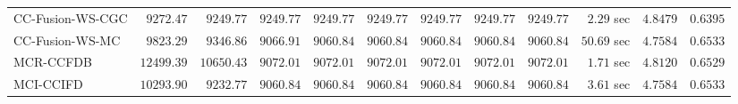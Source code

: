 \begin{table}[H]
\begin{tabular}{lrrrrrrrrrrr}
    CC-Fusion-WS-CGC & $      9272.47$ & $      9249.77$ & $      9249.77$ & $      9249.77$ & $      9249.77$ & $      9249.77$ & $      9249.77$ & $      9249.77$ & $         2.29$ sec    & $       4.8479$  & $       0.6395$ \\ 
     CC-Fusion-WS-MC & $      9823.29$ & $      9346.86$ & $      9066.91$ & $      9060.84$ & $      9060.84$ & $      9060.84$ & $      9060.84$ & $      9060.84$ & $        50.69$ sec    & $       4.7584$  & $       0.6533$ \\ 
\cmidrule{1-1} 
           MCR-CCFDB & $     12499.39$ & $     10650.43$ & $      9072.01$ & $      9072.01$ & $      9072.01$ & $      9072.01$ & $      9072.01$ & $      9072.01$ & $         1.71$ sec    & $       4.8120$  & $       0.6529$ \\ 
\cmidrule{1-1} 
           MCI-CCIFD & $     10293.90$ & $      9232.77$ & $      9060.84$ & $      9060.84$ & $      9060.84$ & $      9060.84$ & $      9060.84$ & $      9060.84$ & $         3.61$ sec    & $       4.7584$  & $       0.6533$ \\ 
\bottomrule
\end{tabular}
\end{table}

